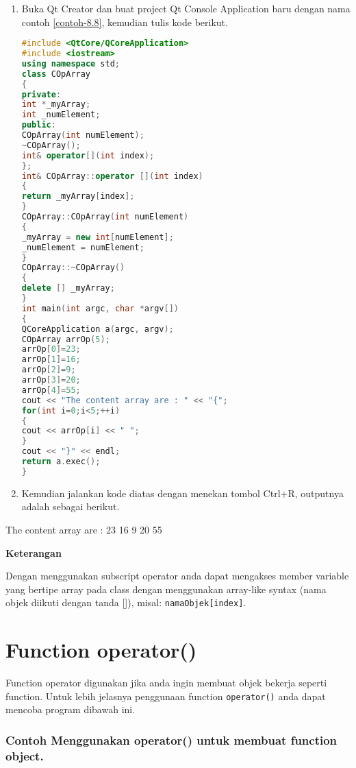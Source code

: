 \begin{enumerate}
\def\labelenumi{\arabic{enumi}.}
\item
  Buka Qt Creator dan buat project Qt Console Application baru dengan
  nama contoh \ref{contoh-8.8}, kemudian tulis kode berikut.

\begin{lstlisting}[language=c++, caption=Subscript Operator untuk Dynamic Array, label=contoh-8.8]
#include <QtCore/QCoreApplication>
#include <iostream>
using namespace std;
class COpArray
{
private:
int *_myArray;
int _numElement;
public:
COpArray(int numElement);
~COpArray();
int& operator[](int index);
};
int& COpArray::operator [](int index)
{
return _myArray[index];
}
COpArray::COpArray(int numElement)
{
_myArray = new int[numElement];
_numElement = numElement;
}
COpArray::~COpArray()
{
delete [] _myArray;
}
int main(int argc, char *argv[])
{
QCoreApplication a(argc, argv);
COpArray arrOp(5);
arrOp[0]=23;
arrOp[1]=16;
arrOp[2]=9;
arrOp[3]=20;
arrOp[4]=55;
cout << "The content array are : " << "{";
for(int i=0;i<5;++i)
{
cout << arrOp[i] << " ";
}
cout << "}" << endl;
return a.exec();
}
\end{lstlisting}
\item
  Kemudian jalankan kode diatas dengan menekan tombol Ctrl+R, outputnya
  adalah sebagai berikut.
\end{enumerate}

\begin{lcverbatim}
The content array are : {23 16 9 20 55 }
\end{lcverbatim}

\textbf{Keterangan}

Dengan menggunakan subscript operator anda dapat mengakses member
variable yang bertipe array pada class dengan menggunakan array-like
syntax (nama objek diikuti dengan tanda {[}{]}), misal:
\texttt{namaObjek{[}index{]}}.

\section{Function operator()}\label{function-operator}

Function operator digunakan jika anda ingin membuat objek bekerja
seperti function. Untuk lebih jelasnya penggunaan function
\texttt{operator()} anda dapat mencoba program dibawah ini.

\subsubsection*{Contoh  Menggunakan operator() untuk membuat function object.}

